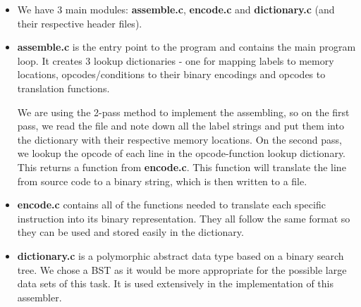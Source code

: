 \documentclass[11pt]{article}
\begin{document}
\begin{itemize}

\item 
We have 3 main modules: \textbf{assemble.c}, \textbf{encode.c} and \textbf{dictionary.c} (and their respective header files).

\item
\textbf{assemble.c} is the entry point to the program and contains the main program loop. It creates 3 lookup dictionaries - one for mapping labels to memory locations, opcodes/conditions to their binary encodings and opcodes to translation functions. 

We are using the 2-pass method to implement the assembling, so on the first pass, we read the file and note down all the label strings and put them into the dictionary with their respective memory locations. On the second pass, we lookup the opcode of each line in the opcode-function lookup dictionary. This returns a function from \textbf{encode.c}. This function will translate the line from source code to a binary string, which is then written to a file.

\item
\textbf{encode.c} contains all of the functions needed to translate each specific instruction into its binary representation. They all follow the same format so they can be used and stored easily in the dictionary.

\item
\textbf{dictionary.c} is a polymorphic abstract data type based on a binary search tree. We chose a BST as it would be more appropriate for the possible large data sets of this task. It is used extensively in the implementation of this assembler.

\end{itemize}
\end{document}
